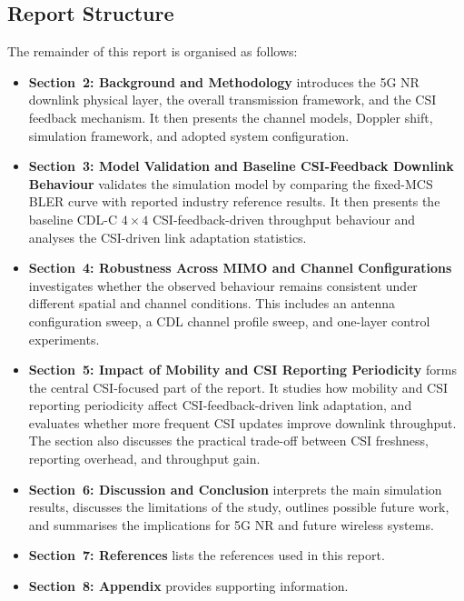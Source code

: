 \documentclass[a4paper,12pt,onecolumn]{article}
\begin{document}
\newpage
\subsection{Report Structure}

	The remainder of this report is organised as follows:
		
		\begin{itemize}
			\item \textbf{Section~2: Background and Methodology} introduces the 5G NR downlink physical layer, the overall transmission framework, and the CSI feedback mechanism. It then presents the channel models, Doppler shift, simulation framework, and adopted system configuration.
			
			\item \textbf{Section~3: Model Validation and Baseline CSI-Feedback Downlink Behaviour} validates the simulation model by comparing the fixed-MCS BLER curve with reported industry reference results. It then presents the baseline CDL-C \(4 \times 4\) CSI-feedback-driven throughput behaviour and analyses the CSI-driven link adaptation statistics.
			
			\item \textbf{Section~4: Robustness Across MIMO and Channel Configurations} investigates whether the observed behaviour remains consistent under different spatial and channel conditions. This includes an antenna configuration sweep, a CDL channel profile sweep, and one-layer control experiments.
			
			\item \textbf{Section~5: Impact of Mobility and CSI Reporting Periodicity} forms the central CSI-focused part of the report. It studies how mobility and CSI reporting periodicity affect CSI-feedback-driven link adaptation, and evaluates whether more frequent CSI updates improve downlink throughput. The section also discusses the practical trade-off between CSI freshness, reporting overhead, and throughput gain.
			
			\item \textbf{Section~6: Discussion and Conclusion} interprets the main simulation results, discusses the limitations of the study, outlines possible future work, and summarises the implications for 5G NR and future wireless systems.
			
			\item \textbf{Section~7: References} lists the references used in this report.
			
			\item \textbf{Section~8: Appendix} provides supporting information.
		\end{itemize}
\end{document}
